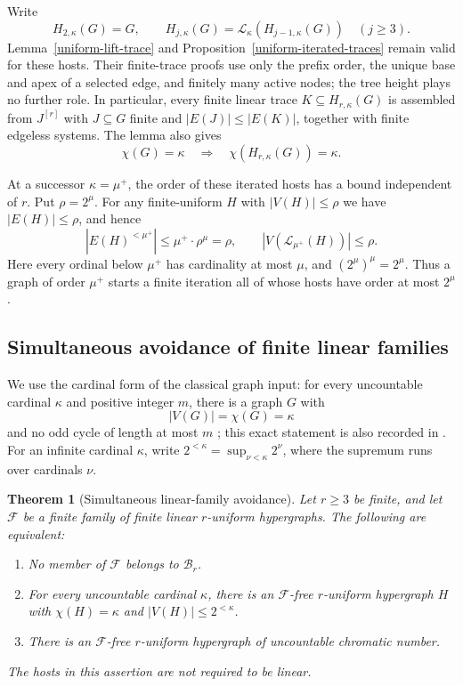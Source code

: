 \documentclass[a4paper,11pt,reqno]{amsart}
\theoremstyle{plain}
\newtheorem{theorem}{Theorem}[section]
\theoremstyle{definition}
\theoremstyle{remark}
\begin{document}
Write
\[
 H_{2,\kappa}(G)=G,\qquad
 H_{j,\kappa}(G)=\mathcal L_\kappa(H_{j-1,\kappa}(G))
 \quad(j\ge3).
\]
Lemma~\ref{uniform-lift-trace} and
Proposition~\ref{uniform-iterated-traces} remain valid for these
hosts.  Their finite-trace proofs use only the prefix order, the
unique base and apex of a selected edge, and finitely many active
nodes; the tree height plays no further role.  In particular, every
finite linear trace $K\subseteq H_{r,\kappa}(G)$ is assembled from
$J^{[r]}$ with $J\subseteq G$ finite and
$|E(J)|\le|E(K)|$, together with finite edgeless systems.
The lemma also gives
\[
 \chi(G)=\kappa
 \quad\Longrightarrow\quad
 \chi(H_{r,\kappa}(G))=\kappa.
\]

At a successor $\kappa=\mu^+$, the order of these iterated hosts
has a bound independent of $r$.  Put $\rho=2^\mu$.
For any finite-uniform $H$ with $|V(H)|\le\rho$ we have
$|E(H)|\le\rho$, and hence
\begin{equation}\label{exact-successor-lift-order}
 |E(H)^{<\mu^+}|
 \le\mu^+\cdot\rho^\mu
 =\rho,
 \qquad
 |V(\mathcal L_{\mu^+}(H))|\le\rho.
\end{equation}
Here every ordinal below $\mu^+$ has cardinality at most $\mu$,
and $(2^\mu)^\mu=2^\mu$.  Thus a graph of order $\mu^+$ starts
a finite iteration all of whose hosts have order at most $2^\mu$.

\subsection{Simultaneous avoidance of finite linear families}
\label{exact-linear-family-subsection}

We use the cardinal form of the classical graph input: for every
uncountable cardinal $\kappa$ and positive integer $m$, there is a
graph $G$ with
\[
 |V(G)|=\chi(G)=\kappa
\]
and no odd cycle of length at most $m$
\citep[Theorem~7.4, p.~76]{erdoshajnal1966}; this exact statement is
also recorded in \citet[Theorem~C, p.~428]{egh1975}.
For an infinite cardinal $\kappa$, write
$2^{<\kappa}=\sup_{\nu<\kappa}2^\nu$, where the supremum runs
over cardinals $\nu$.

\begin{theorem}[Simultaneous linear-family avoidance]
\label{exact-linear-family-avoidance}
Let $r\ge3$ be finite, and let $\mathcal F$ be a finite family of
finite linear $r$-uniform hypergraphs.  The following are equivalent:
\begin{enumerate}
\item No member of $\mathcal F$ belongs to $\mathcal B_r$.
\item For every uncountable cardinal $\kappa$, there is an
      $\mathcal F$-free $r$-uniform hypergraph $H$ with
      $\chi(H)=\kappa$ and $|V(H)|\le2^{<\kappa}$.
\item There is an $\mathcal F$-free $r$-uniform hypergraph of
      uncountable chromatic number.
\end{enumerate}
The hosts in this assertion are not required to be linear.
\end{theorem}
\end{document}
